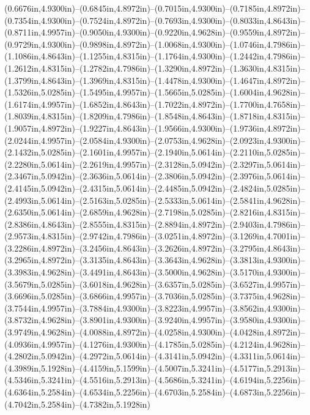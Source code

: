(0.6676in,4.9300in)--(0.6845in,4.8972in)--(0.7015in,4.9300in)--(0.7185in,4.8972in)--(0.7354in,4.9300in)--(0.7524in,4.8972in)--(0.7693in,4.9300in)--(0.8033in,4.8643in)--(0.8711in,4.9957in)--(0.9050in,4.9300in)--(0.9220in,4.9628in)--(0.9559in,4.8972in)--(0.9729in,4.9300in)--(0.9898in,4.8972in)--(1.0068in,4.9300in)--(1.0746in,4.7986in)--(1.1086in,4.8643in)--(1.1255in,4.8315in)--(1.1764in,4.9300in)--(1.2442in,4.7986in)--(1.2612in,4.8315in)--(1.2782in,4.7986in)--(1.3290in,4.8972in)--(1.3630in,4.8315in)--(1.3799in,4.8643in)--(1.3969in,4.8315in)--(1.4478in,4.9300in)--(1.4647in,4.8972in)--(1.5326in,5.0285in)--(1.5495in,4.9957in)--(1.5665in,5.0285in)--(1.6004in,4.9628in)--(1.6174in,4.9957in)--(1.6852in,4.8643in)--(1.7022in,4.8972in)--(1.7700in,4.7658in)--(1.8039in,4.8315in)--(1.8209in,4.7986in)--(1.8548in,4.8643in)--(1.8718in,4.8315in)--(1.9057in,4.8972in)--(1.9227in,4.8643in)--(1.9566in,4.9300in)--(1.9736in,4.8972in)--(2.0244in,4.9957in)--(2.0584in,4.9300in)--(2.0753in,4.9628in)--(2.0923in,4.9300in)--(2.1432in,5.0285in)--(2.1601in,4.9957in)--(2.1940in,5.0614in)--(2.2110in,5.0285in)--(2.2280in,5.0614in)--(2.2619in,4.9957in)--(2.3128in,5.0942in)--(2.3297in,5.0614in)--(2.3467in,5.0942in)--(2.3636in,5.0614in)--(2.3806in,5.0942in)--(2.3976in,5.0614in)--(2.4145in,5.0942in)--(2.4315in,5.0614in)--(2.4485in,5.0942in)--(2.4824in,5.0285in)--(2.4993in,5.0614in)--(2.5163in,5.0285in)--(2.5333in,5.0614in)--(2.5841in,4.9628in)--(2.6350in,5.0614in)--(2.6859in,4.9628in)--(2.7198in,5.0285in)--(2.8216in,4.8315in)--(2.8386in,4.8643in)--(2.8555in,4.8315in)--(2.8894in,4.8972in)--(2.9403in,4.7986in)--(2.9573in,4.8315in)--(2.9742in,4.7986in)--(3.0251in,4.8972in)--(3.1269in,4.7001in)--(3.2286in,4.8972in)--(3.2456in,4.8643in)--(3.2626in,4.8972in)--(3.2795in,4.8643in)--(3.2965in,4.8972in)--(3.3135in,4.8643in)--(3.3643in,4.9628in)--(3.3813in,4.9300in)--(3.3983in,4.9628in)--(3.4491in,4.8643in)--(3.5000in,4.9628in)--(3.5170in,4.9300in)--(3.5679in,5.0285in)--(3.6018in,4.9628in)--(3.6357in,5.0285in)--(3.6527in,4.9957in)--(3.6696in,5.0285in)--(3.6866in,4.9957in)--(3.7036in,5.0285in)--(3.7375in,4.9628in)--(3.7544in,4.9957in)--(3.7884in,4.9300in)--(3.8223in,4.9957in)--(3.8562in,4.9300in)--(3.8732in,4.9628in)--(3.8901in,4.9300in)--(3.9240in,4.9957in)--(3.9580in,4.9300in)--(3.9749in,4.9628in)--(4.0088in,4.8972in)--(4.0258in,4.9300in)--(4.0428in,4.8972in)--(4.0936in,4.9957in)--(4.1276in,4.9300in)--(4.1785in,5.0285in)--(4.2124in,4.9628in)--(4.2802in,5.0942in)--(4.2972in,5.0614in)--(4.3141in,5.0942in)--(4.3311in,5.0614in)--(4.3989in,5.1928in)--(4.4159in,5.1599in)--(4.5007in,5.3241in)--(4.5177in,5.2913in)--(4.5346in,5.3241in)--(4.5516in,5.2913in)--(4.5686in,5.3241in)--(4.6194in,5.2256in)--(4.6364in,5.2584in)--(4.6534in,5.2256in)--(4.6703in,5.2584in)--(4.6873in,5.2256in)--(4.7042in,5.2584in)--(4.7382in,5.1928in)
